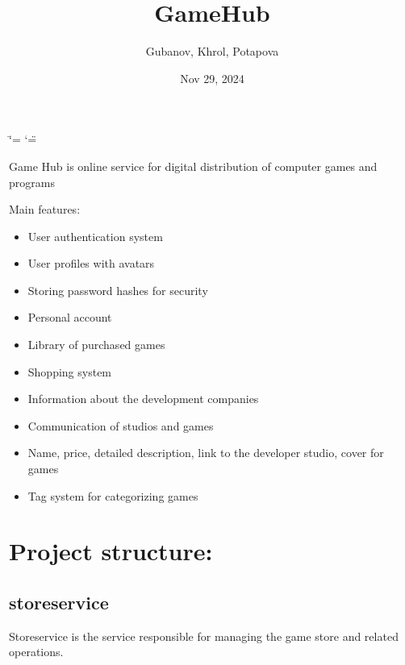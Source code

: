 \documentclass[letterpaper,10pt,english]{sphinxmanual}
\title{GameHub}
\date{Nov 29, 2024}
\author{Gubanov, Khrol, Potapova}
\begin{document}
\ifdefined\shorthandoff
  \ifnum\catcode`\=\string=\active\shorthandoff{=}\fi
  \ifnum\catcode`\"=\active{}\fi
\fi

\pagestyle{empty}
\sphinxmaketitle
\pagestyle{plain}
\sphinxtableofcontents
\pagestyle{normal}
\label{\detokenize{index::doc}}


\sphinxAtStartPar
Game Hub is online service for digital distribution of computer games and programs

\sphinxAtStartPar
Main features:
\begin{itemize}
\item {} 
\sphinxAtStartPar
User authentication system

\item {} 
\sphinxAtStartPar
User profiles with avatars

\item {} 
\sphinxAtStartPar
Storing password hashes for security

\item {} 
\sphinxAtStartPar
Personal account

\item {} 
\sphinxAtStartPar
Library of purchased games

\item {} 
\sphinxAtStartPar
Shopping system

\item {} 
\sphinxAtStartPar
Information about the development companies

\item {} 
\sphinxAtStartPar
Communication of studios and games

\item {} 
\sphinxAtStartPar
Name, price, detailed description, link to the developer studio, cover for games

\item {} 
\sphinxAtStartPar
Tag system for categorizing games

\end{itemize}


\chapter{Project structure:}
\label{\detokenize{index:project-structure}}
\sphinxstepscope


\section{store\sphinxhyphen{}service}
\label{\detokenize{store-service:store-service}}\label{\detokenize{store-service::doc}}
\sphinxAtStartPar
Store\sphinxhyphen{}service is the service responsible for managing the game store and related operations.
\end{document}
